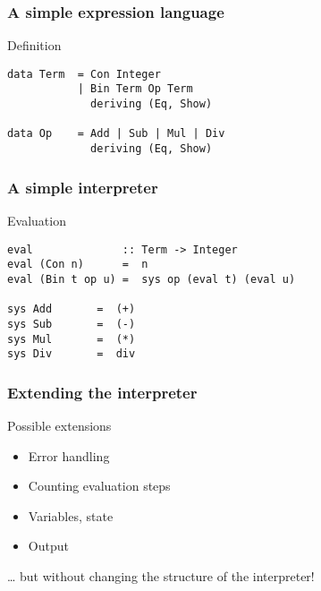\documentclass{beamer}
\subtitle
{Interpreters and Monads}
\begin{document}
\begin{frame}
  \titlepage
\end{frame}



\begin{frame}[fragile]
  \frametitle{A simple expression language}
\begin{block}{Definition}
\begin{verbatim}
data Term  = Con Integer
           | Bin Term Op Term  
             deriving (Eq, Show)
           
data Op    = Add | Sub | Mul | Div
             deriving (Eq, Show)
\end{verbatim}  
\end{block}
\end{frame}             

\begin{frame}[fragile]
  \frametitle{A simple interpreter}
\begin{block}{Evaluation}
\begin{verbatim}
eval              :: Term -> Integer
eval (Con n)      =  n
eval (Bin t op u) =  sys op (eval t) (eval u)

sys Add       =  (+)         
sys Sub       =  (-)
sys Mul       =  (*)         
sys Div       =  div
\end{verbatim}  
\end{block}
\end{frame}             

\begin{frame}[fragile]
  \frametitle{Extending the interpreter}
  \begin{block}{Possible extensions}
    \begin{itemize}
    \item Error handling
    \item Counting evaluation steps
    \item Variables, state
    \item Output
    \end{itemize}
    \dots{} but without changing the structure of the interpreter!
  \end{block}
\end{frame}
\end{document}

